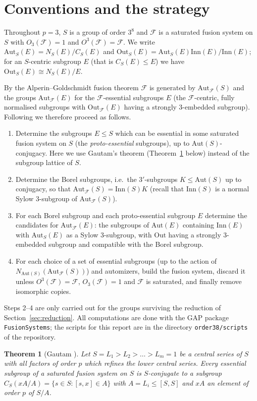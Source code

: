 \documentclass[11pt]{article}
\newtheorem{theorem}{Theorem}[section]
\theoremstyle{definition}
\theoremstyle{remark}
\newcommand{\F}{\mathcal{F}}
\newcommand{\Aut}{\mathrm{Aut}}
\newcommand{\Out}{\mathrm{Out}}
\newcommand{\Inn}{\mathrm{Inn}}
\begin{document}
\section{Conventions and the strategy}\label{sec:strategy}

Throughout $p=3$, $S$ is a group of order $3^8$ and $\F$ is a saturated
fusion system on $S$ with $O_3(\F)=1$ and $O^3(\F)=\F$.  We write
$\Aut_S(E)=N_S(E)/C_S(E)$ and $\Out_S(E)=\Aut_S(E)\Inn(E)/\Inn(E)$; for an
$S$-centric subgroup $E$ (that is $C_S(E)\le E$) we have
$\Out_S(E)\cong N_S(E)/E$.

By the Alperin--Goldschmidt fusion theorem $\F$ is generated by $\Aut_\F(S)$
and the groups $\Aut_\F(E)$ for the $\F$-essential subgroups $E$ (the
$\F$-centric, fully normalised subgroups with $\Out_\F(E)$ having a strongly
$3$-embedded subgroup).  Following \cite{PS} we therefore proceed as
follows.
\begin{enumerate}
\item Determine the subgroups $E\le S$ which can be essential in some
  saturated fusion system on $S$ (the \emph{proto-essential} subgroups), up
  to $\Aut(S)$-conjugacy.  Here we use Gautam's theorem (Theorem~\ref{thm:gautam}
  below) instead of the subgroup lattice of $S$.
\item Determine the Borel subgroups, i.e.\ the $3'$-subgroups $K\le\Aut(S)$
  up to conjugacy, so that $\Aut_\F(S)=\Inn(S)K$ (recall that $\Inn(S)$ is a
  normal Sylow $3$-subgroup of $\Aut_\F(S)$).
\item For each Borel subgroup and each proto-essential subgroup $E$ determine
  the candidates for $\Aut_\F(E)$: the subgroups of $\Aut(E)$ containing
  $\Inn(E)$ with $\Aut_S(E)$ as a Sylow $3$-subgroup, with $\Out$ having a
  strongly $3$-embedded subgroup and compatible with the Borel subgroup.
\item For each choice of a set of essential subgroups (up to the action of
  $N_{\Aut(S)}(\Aut_\F(S))$) and automizers, build the fusion system,
  discard it unless $O^3(\F)=\F$, $O_3(\F)=1$ and $\F$ is saturated, and
  finally remove isomorphic copies.
\end{enumerate}
Steps 2--4 are only carried out for the groups surviving the reduction of
Section~\ref{sec:reduction}.  All computations are done with the GAP package
\texttt{FusionSystems}; the scripts for this report are in the directory
\texttt{order38/scripts} of the repository.

\begin{theorem}[Gautam {\cite[Theorem 3.6]{Gautam}}]\label{thm:gautam}
Let $S=L_1>L_2>\dots>L_m=1$ be a central series of $S$ with all factors
of order $p$ which refines the lower central series.  Every essential
subgroup of a saturated fusion system on $S$ is $S$-conjugate to a subgroup
$C_S(xA/A)=\{s\in S : [s,x]\in A\}$ with $A=L_i\le [S,S]$ and $xA$ an
element of order $p$ of $S/A$.
\end{theorem}
\end{document}
